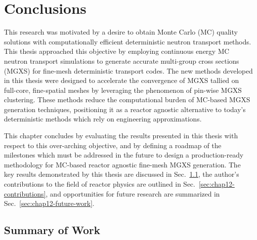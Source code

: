 \chapter{Conclusions}
\label{chap:conclusions-future-work}

This research was motivated by a desire to obtain Monte Carlo (MC) quality solutions with computationally efficient deterministic neutron transport methods. This thesis approached this objective by employing continuous energy \ac{MC} neutron transport simulations to generate accurate  multi-group cross sections (MGXS) for fine-mesh deterministic transport codes. The new methods developed in this thesis were designed to accelerate the convergence of \ac{MGXS} tallied on full-core, fine-spatial meshes by leveraging the phenomenon of pin-wise \ac{MGXS} clustering. These methods reduce the computational burden of \ac{MC}-based \ac{MGXS} generation techniques, positioning it as a reactor agnostic alternative to today's deterministic methods which rely on engineering approximations.

This chapter concludes by evaluating the results presented in this thesis with respect to this over-arching objective, and by defining a roadmap of the milestones which must be addressed in the future to design a production-ready methodology for \ac{MC}-based reactor agnostic fine-mesh \ac{MGXS} generation. The key results demonstrated by this thesis are discussed in Sec.~\ref{sec:chap12-conclusions}, the author's contributions to the field of reactor physics are outlined in Sec.~\ref{sec:chap12-contributions}, and opportunities for future research are summarized in Sec.~\ref{sec:chap12-future-work}.



\section{Summary of Work}
\label{sec:chap12-conclusions}

